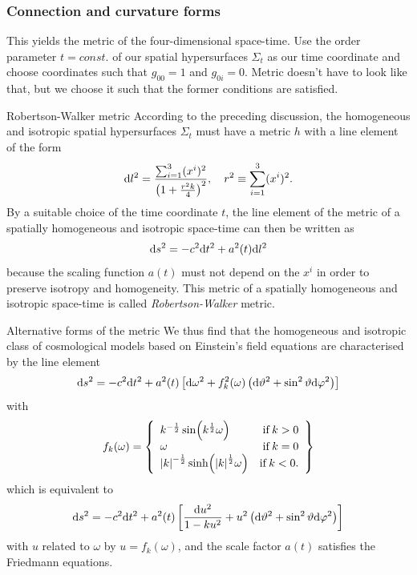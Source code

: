 \subsubsection{Connection and curvature forms}
This yields the metric of the four-dimensional space-time. Use the order parameter $t=const.$ of our spatial hypersurfaces $\Sigma_t$ as our time coordinate and choose coordinates such that $g_{00}=1$ and $g_{0i}=0$. Metric doesn't have to look like that, but we choose it such that the former conditions are satisfied.	
\begin{mybox}{Robertson-Walker metric}
	According to the preceding discussion, the homogeneous and isotropic
	spatial hypersurfaces $\Sigma_t$ must have a metric $h$ with a line element of the
	form
	\begin{equation}
	\mathrm{d} l^2 = \frac{\sum_{i=1}^{3}(x^i)^2}{\left(1+\frac{r^2k}{4}\right)^2}, \quad r^2 \equiv \sum_{i=1}^{3} (x^i)^2.
	\end{equation}
	By a suitable choice of the time coordinate $t$, the line element of the
	metric of a spatially homogeneous and isotropic space-time can then
	be written as
	\begin{equation}
	\label{eq:metricRobertsonWalkerViaField}
	\mathrm{d} s^2 = -c^2 \mathrm{d} t^2 + a^2(t) \mathrm{d} l^2
	\end{equation}
	because the scaling function $a(t)$ must not depend on the $x^i$ in order to
	preserve isotropy and homogeneity. This metric  of a spatially
	homogeneous and isotropic space-time is called \emph{Robertson-Walker}
	metric.
\end{mybox}
\begin{mybox}{Alternative forms of the metric}
	We thus find that the homogeneous and isotropic class of cosmological
	models based on Einstein’s field equations are characterised by the line
	element
	\begin{equation}
	\mathrm{d} s^2 = -c^2 \mathrm{d} t^2 + a^2(t) \left[\mathrm{d} \omega^2 + f^2_k(\omega) \left(\mathrm{d} \vartheta^2 + \sin^2 \vartheta \mathrm{d} \varphi^2\right)\right]
	\end{equation}
	with 
	\begin{equation}
	f_k(\omega)=\left\{	\begin{array}{lr}
	{k}^{- \frac{1}{2}} \sin(k^{\frac{1}{2}} \omega) & \mathrm{if} \, k>0\\
	\omega 												& 			\mathrm{ if} \, k=0 \\
	\abs{k}^{- \frac{1}{2}} \sinh( \abs{k}^{ \frac{1}{2}} \omega) & \mathrm{if} \, k<0.
	\end{array}			\right\}
	\end{equation}
	which is equivalent to
	\begin{equation}
	\mathrm{d} s^2 = -c^2\mathrm{d} t^2 + a^2(t) \left[ \frac{\mathrm{d} u^2}{1 - k u^2} +u^2\left( \mathrm{d} \vartheta^2 + \sin^2\vartheta \mathrm{d} \varphi^2 \right)\right]
	\end{equation}
	with $u$ related to $\omega$ by $u=f_k(\omega)$, and the scale factor $a(t)$ satisfies the
	Friedmann equations.
\end{mybox}
